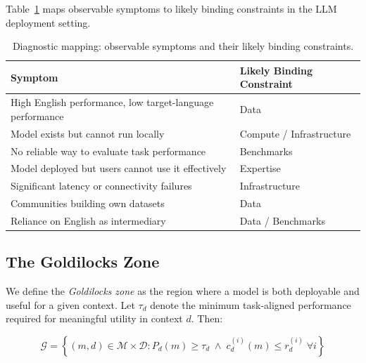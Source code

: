 Table~\ref{tab:diagnostics} maps observable symptoms to likely binding constraints in the LLM deployment setting.

\begin{table}[t]
    \centering
    \small
    \begin{tabular}{p{5.5cm}l}
        \toprule
        \textbf{Symptom}                                          & \textbf{Likely Binding Constraint} \\
        \midrule
        High English performance, low target-language performance & Data                               \\
        Model exists but cannot run locally                       & Compute / Infrastructure           \\
        No reliable way to evaluate task performance              & Benchmarks                         \\
        Model deployed but users cannot use it effectively        & Expertise                          \\
        Significant latency or connectivity failures              & Infrastructure                     \\
        Communities building own datasets                         & Data                               \\
        Reliance on English as intermediary                       & Data / Benchmarks                  \\
        \bottomrule
    \end{tabular}
    \caption{Diagnostic mapping: observable symptoms and their likely binding constraints.}
    \label{tab:diagnostics}
\end{table}

\subsection{The Goldilocks Zone}

We define the \emph{Goldilocks zone} as the region where a model is both deployable and useful for a given context. Let $\tau_d$ denote the minimum task-aligned performance required for meaningful utility in context $d$. Then:

\begin{equation}
    \mathcal{G} = \left\{ (m, d) \in \mathcal{M} \times \mathcal{D} : P_d(m) \geq \tau_d \;\land\; c_d^{(i)}(m) \leq r_d^{(i)} \;\forall i \right\}
    \label{eq:goldilocks}
\end{equation}

